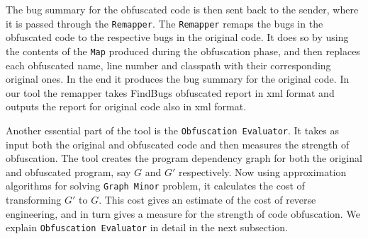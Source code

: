 \documentclass[twocolumn]{article}
\begin{document}
The bug summary for the obfuscated code is then sent back to the sender, where it is passed through the {\tt Remapper}. The {\tt Remapper} remaps the bugs in the obfuscated code to 
the respective bugs in the original code. It does so by using the contents of the {\tt Map} produced during the obfuscation phase, and then replaces each obfuscated name, line number 
and classpath with their corresponding original ones. In the end it produces the bug summary for the original code. In our tool the remapper takes FindBugs obfuscated report in xml 
format and outputs the report for original code also in xml format.

Another essential part of the tool is the {\tt Obfuscation Evaluator}. It takes as input both the original and obfuscated code and then measures the strength of obfuscation. The tool 
creates the program dependency graph for both the original and obfuscated program, say $G$ and $G'$ respectively. Now using approximation algorithms for solving {\tt Graph Minor} 
\cite{graphminor} problem, it calculates the cost of transforming $G'$ to $G$. This cost gives an estimate of the cost of reverse engineering, and in turn gives a measure for the 
strength of code obfuscation. We explain {\tt Obfuscation Evaluator} in detail in the next subsection.
\end{document}
